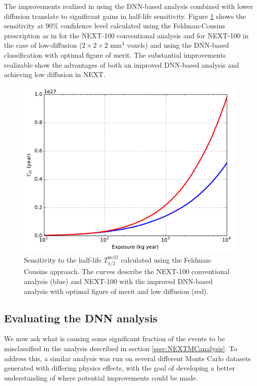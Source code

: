 \documentclass[a4paper,11pt]{article}
\begin{document}
The improvements realized in using the DNN-based analysis combined with lower diffusion translate to significant gains in half-life sensitivity.  Figure \ref{fig.halflife} shows the sensitivity at 90\% confidence level calculated using the Feldman-Cousins \cite{Feldman_1998} prescription as in \cite{NEXT_sensitivity} for the NEXT-100 conventional analysis and for NEXT-100 in the case of low-diffusion ($2 \times 2 \times 2$ mm$^3$ voxels) and using the DNN-based classification with optimal figure of merit. The substantial improvements realizable show the advantages of both an improved DNN-based analysis and achieving low diffusion in NEXT.

\begin{figure}[!htb]
	\centering
	\includegraphics[scale=0.55]{fig/half_life_sensitivity.pdf}
	\caption{\label{fig.halflife}Sensitivity to the half-life $T^{0\nu\beta\beta}_{1/2}$ calculated using the Feldman-Cousins approach.  The curves describe the NEXT-100 conventional analysis \cite{NEXT_sensitivity} (blue) and NEXT-100 with the improved DNN-based analysis with optimal figure of merit and low diffusion (red).}
\end{figure}

\subsection{Evaluating the DNN analysis}\label{ssec:DNNeval}
We now ask what is causing some significant fraction of the events to be misclassified in the analysis described in section \ref{ssec:NEXTMCanalysis}.  To address this, a similar analysis was run 
on several different Monte Carlo datasets generated with differing physics effects, with the goal of developing a better understanding of where potential improvements could be made.
\end{document}
